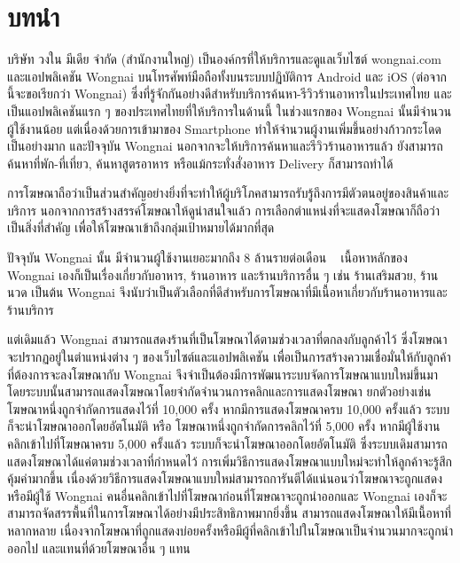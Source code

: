 \chapter{บทนำ}
\label{chapter:introduction}

บริษัท วงใน มีเดีย จำกัด (สำนักงานใหญ่) เป็นองค์กรที่ให้บริการและดูแลเว็บไซต์ wongnai.com และแอปพลิเคชัน Wongnai บนโทรศัพท์มือถือทั้งบนระบบปฏิบัติการ Android และ iOS (ต่อจากนี้จะขอเรียกว่า Wongnai) ซึ่งที่รู้จักกันอย่างดีสำหรับบริการค้นหา-รีวิวร้านอาหารในประเทศไทย และเป็นแอปพลิเคชันแรก ๆ ของประเทศไทยที่ให้บริการในด้านนี้ ในช่วงแรกของ Wongnai นั้นมีจำนวนผู้ใช้งานน้อย แต่เนื่องด้วยการเข้ามาของ Smartphone ทำให้จำนวนผู้งานเพิ่มขึ้นอย่างก้าวกระโดดเป็นอย่างมาก และปัจจุบัน Wongnai นอกจากจะให้บริการค้นหาและรีวิวร้านอาหารแล้ว ยังสามารถค้นหาที่พัก-ที่เที่ยว, ค้นหาสูตรอาหาร หรือแม้กระทั่งสั่งอาหาร Delivery ก็สามารถทำได้

การโฆษณาถือว่าเป็นส่วนสำคัญอย่างยิ่งที่จะทำให้ผู้บริโภคสามารถรับรู้ถึงการมีตัวตนอยู่ของสินค้าและบริการ นอกจากการสร้างสรรค์โฆษณาให้ดูน่าสนใจแล้ว การเลือกตำแหน่งที่จะแสดงโฆษณาก็ถือว่าเป็นสิ่งที่สำคัญ เพื่อให้โฆษณาเข้าถึงกลุ่มเป้าหมายได้มากที่สุด

ปัจจุบัน Wongnai นั้น มีจำนวนผู้ใช้งานเยอะมากถึง 8 ล้านรายต่อเดือน ~\cite{wongnai} เนื้อหาหลักของ Wongnai เองก็เป็นเรื่องเกี่ยวกับอาหาร, ร้านอาหาร และร้านบริการอื่น ๆ เช่น ร้านเสริมสวย, ร้านนวด เป็นต้น Wongnai จึงนับว่าเป็นตัวเลือกที่ดีสำหรับการโฆษณาที่มีเนื้อหาเกี่ยวกับร้านอาหารและร้านบริการ

แต่เดิมแล้ว Wongnai สามารถแสดงร้านที่เป็นโฆษณาได้ตามช่วงเวลาที่ตกลงกับลูกค้าไว้ ซึ่งโฆษณาจะปรากฏอยู่ในตำแหน่งต่าง ๆ ของเว็บไซต์และแอปพลิเคชัน เพื่อเป็นการสร้างความเชื่อมั่นให้กับลูกค้าที่ต้องการจะลงโฆษณากับ Wongnai จึงจำเป็นต้องมีการพัฒนาระบบจัดการโฆษณาแบบใหม่ขึ้นมา โดยระบบนั้นสามารถแสดงโฆษณาโดยจำกัดจำนวนการคลิกและการแสดงโฆษณา ยกตัวอย่างเช่น โฆษณาหนึ่งถูกจำกัดการแสดงไว้ที่ 10,000 ครั้ง หากมีการแสดงโฆษณาครบ 10,000 ครั้งแล้ว ระบบก็จะนำโฆษณาออกโดยอัตโนมัติ หรือ โฆษณาหนึ่งถูกจำกัดการคลิกไว้ที่ 5,000 ครั้ง หากมีผู้ใช้งานคลิกเข้าไปที่โฆษณาครบ 5,000 ครั้งแล้ว ระบบก็จะนำโฆษณาออกโดยอัตโนมัติ ซึ่งระบบเดิมสามารถแสดงโฆษณาได้แค่ตามช่วงเวลาที่กำหนดไว้ การเพิ่มวิธีการแสดงโฆษณาแบบใหม่จะทำให้ลูกค้าจะรู้สึกคุ้มค่ามากขึ้น เนื่องด้วยวิธีการแสดงโฆษณาแบบใหม่สามารถการันตีได้แน่นอนว่าโฆษณาจะถูกแสดงหรือมีผู้ใช้ Wongnai คนอื่นคลิกเข้าไปที่โฆษณาก่อนที่โฆษณาจะถูกนำออกและ Wongnai เองก็จะสามารถจัดสรรพื้นที่ในการโฆษณาได้อย่างมีประสิทธิภาพมากยิ่งขึ้น สามารถแสดงโฆษณาให้มีเนื้อหาที่หลากหลาย เนื่องจากโฆษณาที่ถูกแสดงบ่อยครั้งหรือมีผู้ที่คลิกเข้าไปในโฆษณาเป็นจำนวนมากจะถูกนำออกไป และแทนที่ด้วยโฆษณาอื่น ๆ แทน

